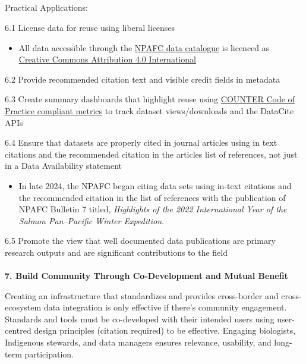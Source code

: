 \documentclass[
  letterpaper,
  DIV=11,
  numbers=noendperiod]{scrartcl}
\makeatletter
\let\oldparagraph\paragraph
\renewcommand{\paragraph}{
    \@ifstar
      \xxxParagraphStar
      \xxxParagraphNoStar
  }
\newcommand{\xxxParagraphStar}[1]{\oldparagraph*{#1}\mbox{}}
\newcommand{\xxxParagraphNoStar}[1]{\oldparagraph{#1}\mbox{}}
\let\oldsubparagraph\subparagraph
\renewcommand{\subparagraph}{
    \@ifstar
      \xxxSubParagraphStar
      \xxxSubParagraphNoStar
  }
\newcommand{\xxxSubParagraphStar}[1]{\oldsubparagraph*{#1}\mbox{}}
\newcommand{\xxxSubParagraphNoStar}[1]{\oldsubparagraph{#1}\mbox{}}
\providecommand{\tightlist}{%
  \setlength{\itemsep}{0pt}\setlength{\parskip}{0pt}}\usepackage{longtable,booktabs,array}
\makeatother
\begin{document}
\subparagraph{Practical Applications:}\label{practical-applications-5}

6.1 License data for reuse using liberal licenses

\begin{itemize}
\tightlist
\item
  All data accessible through the \href{https://data.npafc.org}{NPAFC
  data catalogue} is licenced as~
  \href{https://creativecommons.org/licenses/by/4.0/deed.en}{Creative
  Commons Attribution 4.0 International}
\end{itemize}

6.2 Provide recommended citation text and visible credit fields in
metadata

6.3 Create summary dashboards that highlight reuse using
\href{https://www.countermetrics.org/}{COUNTER Code of Practice
compliant metrics} to track dataset views/downloads and the DataCite
APIs

6.4 Ensure that datasets are properly cited in journal articles using in
text citations and the recommended citation in the articles list of
references, not just in a Data Availability statement

\begin{itemize}
\tightlist
\item
  In late 2024, the NPAFC began citing data sets using in-text citations
  and the recommended citation in the list of references with the
  publication of NPAFC Bulletin 7 titled, \emph{Highlights of the 2022
  International Year of the Salmon Pan--Pacific Winter Expedition}.
\end{itemize}

6.5 Promote the view that well documented data publications are primary
research outputs and are significant contributions to the field

\paragraph{\texorpdfstring{\textbf{7. Build Community Through
Co-Development and Mutual
Benefit}}{7. Build Community Through Co-Development and Mutual Benefit}}\label{build-community-through-co-development-and-mutual-benefit}

Creating an infrastructure that standardizes and provides cross-border
and cross-ecosystem data integration is only effective if there's
community engagement. Standards and tools must be co-developed with
their intended users using user-centred design principles (citation
required) to be effective. Engaging biologists, Indigenous stewards, and
data managers ensures relevance, usability, and long-term participation.
\end{document}
